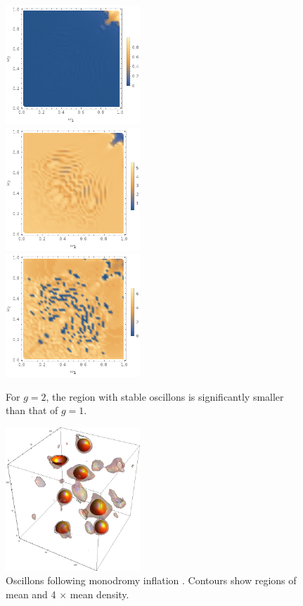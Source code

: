 \documentclass[%
reprint,
superscriptaddress,
amsmath,amssymb,
aps,
prd,
floatfix,
nofootinbib
]{revtex4-1}
\begin{document}
\begin{figure}
    \centering
    \includegraphics[width=0.45\textwidth]{plot/energy-ratio-phi6-1d-g_2.png}\\
    \includegraphics[width=0.45\textwidth]{plot/r_max-phi6-1d-g_2.png}\\
    \includegraphics[width=0.45\textwidth]{plot/slow-mode-logscale-phi6-1d-g_2.png}\\
    \caption{For $g=2$, the region with stable oscillons is significantly smaller than that of $g=1$.}\label{phi6g2}
\end{figure}

\begin{figure}
  \centering
  \includegraphics[width=0.45\textwidth]{plot/3dRE.png}
  \caption{Oscillons following monodromy inflation  \cite{Easther:2010qz}. Contours show regions of mean and 4 $\times$ mean density. }\label{oscillons}
\end{figure}
\end{document}
